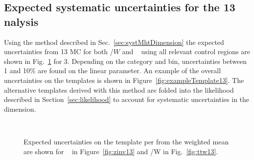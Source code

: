\subsection{Expected systematic uncertainties for the 13 \texorpdfstring{\TeV} analysis}
\label{sec:syst13TeV}
Using the method described in Sec.~\ref{sec:systMhtDimension} the expected uncertainties
from 13 \TeV MC for both \ttbar/$W$  and \zInv~ using all relevant control regions are
shown in Fig.~\ref{fig:expected13} for 3\ifb. 
Depending on the category and \scalht bin, uncertainties between 1 and 10\% are found
on the linear parameter.
An example of the overall uncertainties on the \mht templates is shown
in Figure~\ref{fig:exampleTemplate13}.
The alternative templates derived with this method are folded into the 
likelihood described in Section~\ref{sec:likelihood} to account for
systematic uncertainties in the \mht dimension.


\begin{figure}[h!]
  \centering
  ~~
  \\
  \caption{\label{fig:expected13} Expected uncertainties on the template per \GeV from the weighted mean are shown for \zInv~ in Figure~\ref{fig:zinv13} 
  and \ttbar/W in Fig.~\ref{fig:ttw13}.}
  
\end{figure}

